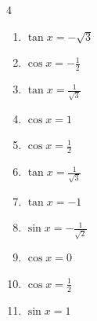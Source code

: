 \begin{multicols}{4}
\begin{enumerate}
  \item $\displaystyle \tan{x}  = -\sqrt{3}$


  \item $\displaystyle \cos{x}  = -\frac{1}{2}$


  \item $\displaystyle \tan{x}  = \frac{1}{\sqrt{3}}$


  \item $\displaystyle \cos{x}  = 1$

        \phantom{$\displaystyle x = 0$}

  \item $\displaystyle \cos{x}  = \frac{1}{2}$


  \item $\displaystyle \tan{x}  = \frac{1}{\sqrt{3}}$


  \item $\displaystyle \tan{x}  = -1$


  \item $\displaystyle \sin{x}  = -\frac{1}{\sqrt{2}}$


  \item $\displaystyle \cos{x}  = 0$


  \item $\displaystyle \cos{x}  = \frac{1}{2}$


\columnbreak %

  \item $\displaystyle \sin{x}  = 1$



\end{enumerate}
\end{multicols}
